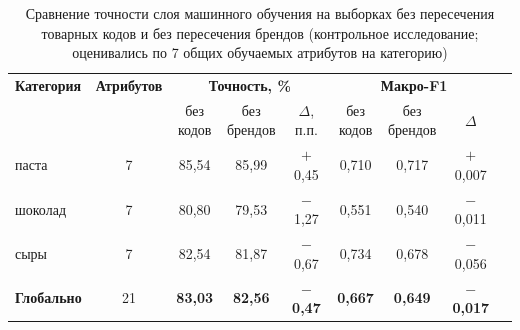 \begin{table}[H]
\caption{Сравнение точности слоя машинного обучения на выборках без пересечения товарных кодов и без пересечения брендов (контрольное исследование; оценивались по 7 общих обучаемых атрибутов на категорию)}
\label{tab:brand_disjoint_compare}
\centering
\small
\begin{tabular}{lcccccccc}
\toprule
\textbf{Категория} & \textbf{Атрибутов} & \multicolumn{3}{c}{\textbf{Точность, \%}} & \multicolumn{3}{c}{\textbf{Макро-F1}} \\
\cmidrule(lr){3-5} \cmidrule(lr){6-8}
 & & \shortstack{без\\кодов} & \shortstack{без\\брендов} & $\Delta$, п.п. & \shortstack{без\\кодов} & \shortstack{без\\брендов} & $\Delta$ \\
\midrule
паста & 7 & 85,54 & 85,99 & $+$0,45 & 0,710 & 0,717 & $+$0,007 \\
шоколад & 7 & 80,80 & 79,53 & $-$1,27 & 0,551 & 0,540 & $-$0,011 \\
сыры & 7 & 82,54 & 81,87 & $-$0,67 & 0,734 & 0,678 & $-$0,056 \\
\midrule
\textbf{Глобально} & 21 & \textbf{83,03} & \textbf{82,56} & \textbf{$-$0,47} & \textbf{0,667} & \textbf{0,649} & \textbf{$-$0,017} \\
\bottomrule
\end{tabular}
\end{table}
